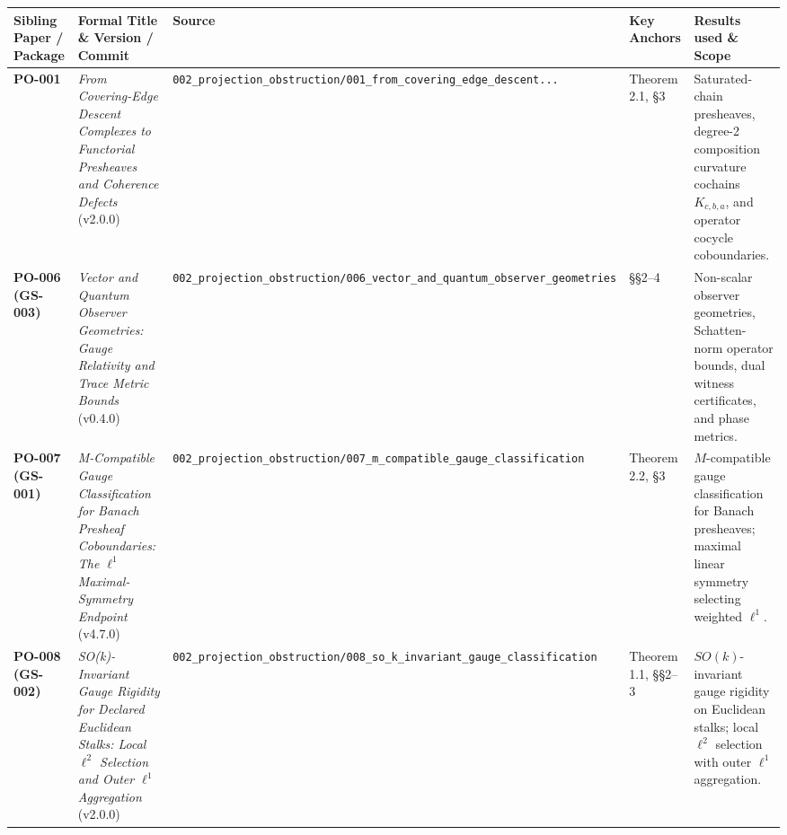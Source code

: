 \documentclass[
  11pt,
]{article}
\begin{document}
\begin{longtable}[]{@{}
  >{\raggedright\arraybackslash}p{}
  >{\raggedright\arraybackslash}p{}
  >{\raggedright\arraybackslash}p{}
  >{\raggedright\arraybackslash}p{}
  >{\raggedright\arraybackslash}p{}@{}}
\toprule\noalign{}
\begin{minipage}[b]{\linewidth}\raggedright
Sibling Paper / Package
\end{minipage} & \begin{minipage}[b]{\linewidth}\raggedright
Formal Title \& Version / Commit
\end{minipage} & \begin{minipage}[b]{\linewidth}\raggedright
Source
\end{minipage} & \begin{minipage}[b]{\linewidth}\raggedright
Key Anchors
\end{minipage} & \begin{minipage}[b]{\linewidth}\raggedright
Results used \& Scope
\end{minipage} \\
\midrule\noalign{}
\endhead
\bottomrule\noalign{}
\endlastfoot
\textbf{PO-001} & \emph{From Covering-Edge Descent Complexes to Functorial Presheaves and Coherence Defects} (v2.0.0) & \texttt{002\_projection\_obstruction/001\_from\_covering\_edge\_descent...} & Theorem 2.1, §3 & Saturated-chain presheaves, degree-2 composition curvature cochains \(K_{c,b,a}\), and operator cocycle coboundaries. \\
\textbf{PO-006 (GS-003)} & \emph{Vector and Quantum Observer Geometries: Gauge Relativity and Trace Metric Bounds} (v0.4.0) & \texttt{002\_projection\_obstruction/006\_vector\_and\_quantum\_observer\_geometries} & §§2--4 & Non-scalar observer geometries, Schatten-norm operator bounds, dual witness certificates, and phase metrics. \\
\textbf{PO-007 (GS-001)} & \emph{M-Compatible Gauge Classification for Banach Presheaf Coboundaries: The \(\ell^1\) Maximal-Symmetry Endpoint} (v4.7.0) & \texttt{002\_projection\_obstruction/007\_m\_compatible\_gauge\_classification} & Theorem 2.2, §3 & \(M\)-compatible gauge classification for Banach presheaves; maximal linear symmetry selecting weighted \(\ell^1\). \\
\textbf{PO-008 (GS-002)} & \emph{SO(k)-Invariant Gauge Rigidity for Declared Euclidean Stalks: Local \(\ell^2\) Selection and Outer \(\ell^1\) Aggregation} (v2.0.0) & \texttt{002\_projection\_obstruction/008\_so\_k\_invariant\_gauge\_classification} & Theorem 1.1, §§2--3 & \(SO(k)\)-invariant gauge rigidity on Euclidean stalks; local \(\ell^2\) selection with outer \(\ell^1\) aggregation. \\

\end{longtable}
\end{document}
